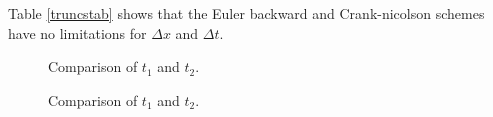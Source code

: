 \documentclass[10pt,a4paper]{article}
\begin{document}
\noindent Table \ref{truncstab} shows that the Euler backward and Crank-nicolson schemes have no limitations for $\Delta x$ and $\Delta t$. 


\begin{figure}[H]
 	\centering
  	\caption{\label{fig:methods10}Comparison of $t_1$ and $t_2$.}
\end{figure}

\begin{figure}[H]
 	\centering
  	\caption{\label{fig:methods100}Comparison of $t_1$ and $t_2$.}
\end{figure}
\end{document}
